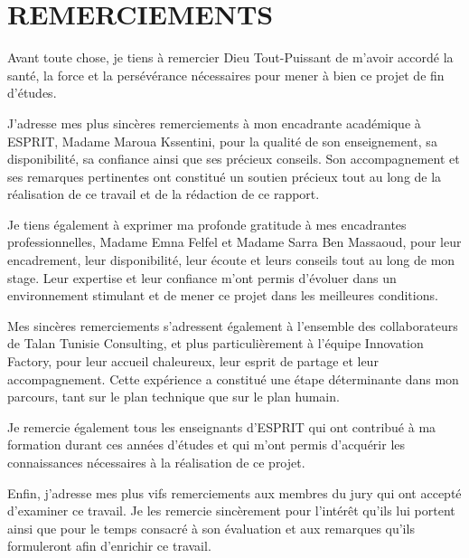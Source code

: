\chapter*{REMERCIEMENTS}
\thispagestyle{MyStyle}

Avant toute chose, je tiens à remercier Dieu Tout-Puissant de m'avoir accordé la santé, la
force et la persévérance nécessaires pour mener à bien ce projet de fin d'études.

J'adresse mes plus sincères remerciements à mon encadrante académique à ESPRIT, Madame
Maroua Kssentini, pour la qualité de son enseignement, sa disponibilité, sa confiance ainsi
que ses précieux conseils. Son accompagnement et ses remarques pertinentes ont constitué un
soutien précieux tout au long de la réalisation de ce travail et de la rédaction de ce
rapport.

Je tiens également à exprimer ma profonde gratitude à mes encadrantes professionnelles,
Madame Emna Felfel et Madame Sarra Ben Massaoud, pour leur encadrement, leur disponibilité,
leur écoute et leurs conseils tout au long de mon stage. Leur expertise et leur confiance
m'ont permis d'évoluer dans un environnement stimulant et de mener ce projet dans les
meilleures conditions.

Mes sincères remerciements s'adressent également à l'ensemble des collaborateurs de Talan
Tunisie Consulting, et plus particulièrement à l'équipe Innovation Factory, pour leur
accueil chaleureux, leur esprit de partage et leur accompagnement. Cette expérience a
constitué une étape déterminante dans mon parcours, tant sur le plan technique que sur le
plan humain.

Je remercie également tous les enseignants d'ESPRIT qui ont contribué à ma formation durant
ces années d'études et qui m'ont permis d'acquérir les connaissances nécessaires à la
réalisation de ce projet.

Enfin, j'adresse mes plus vifs remerciements aux membres du jury qui ont accepté d'examiner
ce travail. Je les remercie sincèrement pour l'intérêt qu'ils lui portent ainsi que pour le
temps consacré à son évaluation et aux remarques qu'ils formuleront afin d'enrichir ce
travail.
